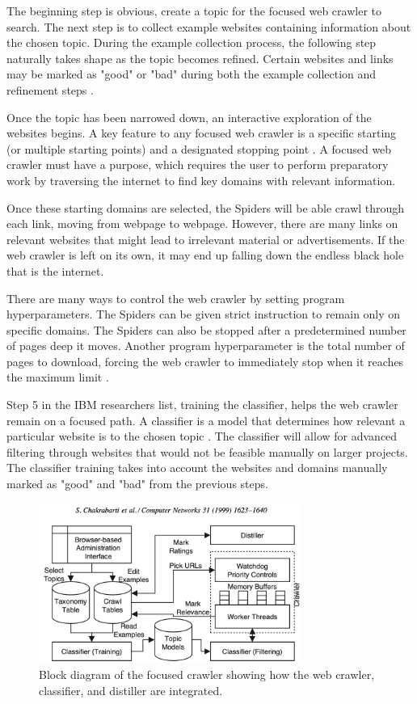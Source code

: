 \documentclass[5p,authoryear]{elsarticle}
\begin{document}
The beginning step is obvious, create a topic for the focused web crawler to search. The next step is to collect example websites containing information about the chosen topic. During the example collection process, the following step naturally takes shape as the topic becomes refined. Certain websites and links may be marked as "good" or "bad" during both the example collection and refinement steps \citep{focused}. 

Once the topic has been narrowed down, an interactive exploration of the websites begins. A key feature to any focused web crawler is a specific starting (or multiple starting points) and a designated stopping point \citep{crawl}. A focused web crawler must have a purpose, which requires the user to perform preparatory work by traversing the internet to find key domains with relevant information. 

Once these starting domains are selected, the Spiders will be able crawl through each link, moving from webpage to webpage. However, there are many links on relevant websites that might lead to irrelevant material or advertisements. If the web crawler is left on its own, it may end up falling down the endless black hole that is the internet.

There are many ways to control the web crawler by setting program hyperparameters. The Spiders can be given strict instruction to remain only on specific domains. The Spiders can also be stopped after a predetermined number of pages deep it moves. Another program hyperparameter is the total number of pages to download, forcing the web crawler to immediately stop when it reaches the maximum limit \citep{crawl}. 

Step 5 in the IBM researchers list, training the classifier, helps the web crawler remain on a focused path. A classifier is a model that determines how relevant a particular website is to the chosen topic \citep{focused}. The classifier will allow for advanced filtering through websites that would not be feasible manually on larger projects. The classifier training takes into account the websites and domains manually marked as "good" and "bad" from the previous steps. 

\begin{figure}[!h] 
    \centering
	\includegraphics[width=3.4in]{figures/focused_webcrawler_diagram.png}
	\caption[]{Block diagram of the focused crawler showing how the web crawler, classifier, and distiller are integrated.} 
	\label{web_flow} 
\end{figure}
\end{document}
